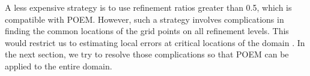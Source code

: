 A less expensive strategy is to use refinement ratios greater than 0.5, which is compatible with POEM. However, such a strategy involves complications in finding the common locations of the grid points on all refinement levels. This would restrict us to estimating local errors at critical locations of the domain \citep{Roache1994Perspective:Studies,Trivedi2019}. In the next section, we try to resolve those complications so that POEM can be applied to the entire domain.


\FloatBarrier